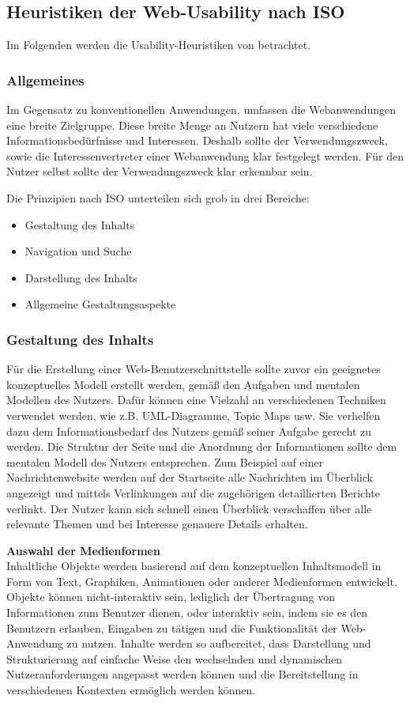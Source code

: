\documentclass[utf8,biblatex]{lni}
\begin{document}
\subsection{Heuristiken der Web-Usability nach ISO}
Im Folgenden werden die Usability-Heuristiken von \cite[]{DINDeutschesInstitutfurNormunge.V..c} betrachtet.


\subsubsection{Allgemeines}
Im Gegensatz zu konventionellen Anwendungen, umfassen die Webanwendungen eine breite Zielgruppe. Diese breite Menge an Nutzern hat viele verschiedene Informationsbedürfnisse und Interessen. Deshalb sollte der Verwendungszweck, sowie die Interessenvertreter einer Webanwendung klar festgelegt werden. Für den Nutzer selbst sollte der Verwendungszweck klar erkennbar sein.

Die Prinzipien nach ISO unterteilen sich grob in drei Bereiche:
\begin{itemize}
  \item Gestaltung des Inhalts
  \item Navigation und Suche
  \item Darstellung des Inhalts
  \item Allgemeine Gestaltungsaspekte
\end{itemize}


\subsubsection{Gestaltung des Inhalts}
Für die Erstellung einer Web-Benutzerschnittstelle sollte zuvor ein geeignetes konzeptuelles Modell erstellt werden, gemäß den Aufgaben und mentalen Modellen des Nutzers. Dafür können eine Vielzahl an verschiedenen Techniken verwendet werden, wie z.B. UML-Diagramme, Topic Maps usw. Sie verhelfen dazu dem Informationsbedarf des Nutzers gemäß seiner Aufgabe gerecht zu werden. Die Struktur der Seite und die Anordnung der Informationen sollte dem mentalen Modell des Nutzers entsprechen. Zum Beispiel auf einer Nachrichtenwebsite werden auf der Startseite alle Nachrichten im Überblick angezeigt und mittels Verlinkungen auf die zugehörigen detaillierten Berichte verlinkt. Der Nutzer kann sich schnell einen Überblick verschaffen über alle relevante Themen und bei Interesse genauere Details erhalten.

\textbf{Auswahl der Medienformen}\\
Inhaltliche Objekte werden basierend auf dem konzeptuellen Inhaltsmodell in Form von Text, Graphiken, Animationen oder anderer Medienformen entwickelt. Objekte können nicht-interaktiv
sein, lediglich der Übertragung von Informationen zum Benutzer dienen, oder interaktiv sein, indem sie es
den Benutzern erlauben, Eingaben zu tätigen und die Funktionalität der Web-Anwendung zu nutzen. Inhalte werden so aufbereitet, dass Darstellung und Strukturierung auf einfache Weise den wechselnden und dynamischen Nutzeranforderungen angepasst werden können und die Bereitstellung in verschiedenen Kontexten ermöglich werden können.
\end{document}
